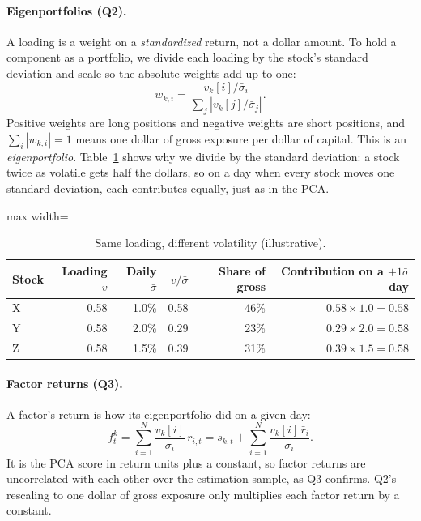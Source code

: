 \documentclass[11pt,letterpaper]{article}
\begin{document}
\paragraph{Eigenportfolios (Q2).} A loading is a weight on a
\emph{standardized} return, not a dollar amount. To hold a component as a
portfolio, we divide each loading by the stock's standard deviation and
scale so the absolute weights add up to one:
\[
w_{k,i}=\frac{v_k[i]/\bar\sigma_i}{\sum_{j}\left|v_k[j]/\bar\sigma_j\right|}.
\]
Positive weights are long positions and negative weights are short
positions, and $\sum_i|w_{k,i}|=1$ means one dollar of gross exposure per
dollar of capital. This is an \emph{eigenportfolio}.
Table~\ref{tab:primer-vol} shows why we divide by the standard deviation:
a stock twice as volatile gets half the dollars, so on a day when every
stock moves one standard deviation, each contributes equally, just as in
the PCA.

\begin{table}[!htbp]
\centering
\caption{Same loading, different volatility (illustrative).}
\label{tab:primer-vol}
\begin{adjustbox}{max width=\linewidth}
\begin{tabular}{lrrrrr}
\toprule
Stock & Loading $v$ & Daily $\bar\sigma$ & $v/\bar\sigma$ & Share of gross & Contribution on a $+1\bar\sigma$ day \\
\midrule
X & 0.58 & 1.0\% & 0.58 & 46\% & $0.58\times1.0=0.58$ \\
Y & 0.58 & 2.0\% & 0.29 & 23\% & $0.29\times2.0=0.58$ \\
Z & 0.58 & 1.5\% & 0.39 & 31\% & $0.39\times1.5=0.58$ \\
\bottomrule
\end{tabular}
\end{adjustbox}
\end{table}

\paragraph{Factor returns (Q3).} A factor's return is how its
eigenportfolio did on a given day:
\[
f^k_t=\sum_{i=1}^{N}\frac{v_k[i]}{\bar\sigma_i}\,r_{i,t}
=s_{k,t}+\sum_{i=1}^{N}\frac{v_k[i]\,\bar r_i}{\bar\sigma_i}.
\]
It is the PCA score in return units plus a constant, so factor returns
are uncorrelated with each other over the estimation sample, as Q3
confirms. Q2's rescaling to one dollar of gross exposure only multiplies
each factor return by a constant.
\end{document}
